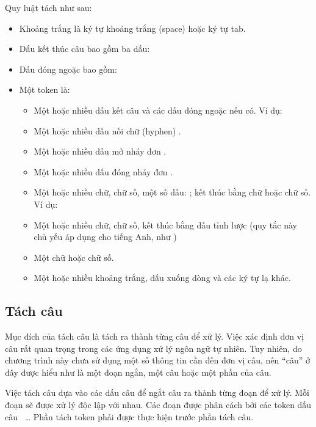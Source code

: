 \documentclass[a4paper,oneside,14pt]{extbook} %
\begin{document}
Quy luật tách như sau:
\begin{itemize}
\item Khoảng trắng là ký tự khoảng trắng (space) hoặc ký tự tab.
\item Dấu kết thúc câu bao gồm ba dấu:   \mybox{!}
\item Dấu đóng ngoặc bao gồm:  \mybox{)} \mybox{]} \mybox{\}}
  \mybox{>} 
\item Một token là:
  \begin{itemize}
  \item Một hoặc nhiều dấu kết câu và các dấu đóng ngoặc nếu có. Ví
    dụ: 
  \item Một hoặc nhiều dấu nối chữ (hyphen) \mybox{-}.
  \item Một hoặc nhiều dấu mở nháy đơn .
  \item Một hoặc nhiều dấu đóng nháy đơn .
  \item Một hoặc nhiều chữ, chữ số, một số dấu:  \mybox{,}
    \mybox{:}  \mybox{\$} \mybox{\%} \mybox{-}
    \mybox{$\backslash$} \mybox{/}; kết thúc bằng chữ hoặc chữ số. Ví
    dụ:  
  \item Một hoặc nhiều chữ, chữ số, kết thúc bằng dấu tỉnh lược
     (quy tắc này chủ yếu áp dụng cho tiếng Anh, như
      \mybox{ }  \mybox{ } )
  \item Một chữ hoặc chữ số.
  \item Một hoặc nhiều khoảng trắng,  dấu xuống dòng và các ký tự lạ khác.
  \end{itemize}
\end{itemize}

\subsection{Tách câu}

Mục đích của tách câu là tách ra thành từng câu để xử lý. Việc xác
định đơn vị câu rất quan trọng trong các ứng dụng xử lý ngôn ngữ tự
nhiên. Tuy nhiên, do chương trình này chưa sử dụng một số thông tin
cần đến đơn vị câu, nên ``câu'' ở đây được hiểu như là một đoạn ngắn,
một câu hoặc một phần của câu. 

Việc tách câu dựa vào các dấu câu để ngắt câu ra thành từng đoạn để xử
lý. Mỗi đoạn sẽ được xử lý độc lập với nhau. Các đoạn được phân cách
bởi các token dấu câu  \mybox{,} \mybox{;} \mybox{(}
\mybox{)}~\ldots{} Phần tách token phải được thực hiện trước phần tách
câu. 
\end{document}
